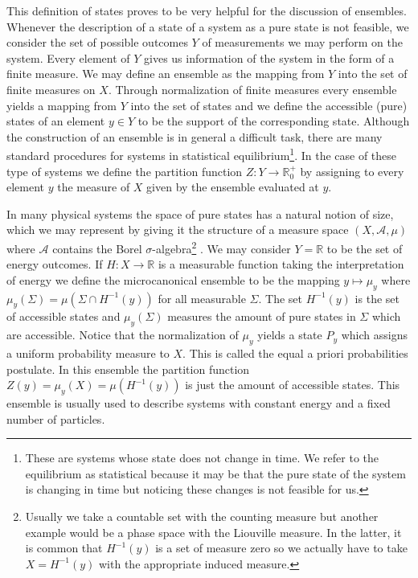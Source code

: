 This definition of states proves to be very helpful for the discussion of ensembles. Whenever the description of a state of a system as a pure state is not feasible, we consider the set of possible outcomes $Y$ of measurements we may perform on the system. Every element of $Y$ gives us information of the system in the form of a finite measure. We may define an ensemble as the mapping from $Y$ into the set of finite measures on $X$. Through normalization of finite measures every ensemble yields a mapping from $Y$ into the set of states and we define the accessible (pure) states of an element $y\in Y$ to be the support of the corresponding state. Although the construction of an ensemble is in general a difficult task,  there are many standard procedures for systems in statistical equilibrium\footnote{These are systems whose state does not change in time. We refer to the equilibrium as statistical because it may be that the pure state of the system is changing in time but noticing these changes is not feasible for us.}. In the case of these type of systems we define the partition function $Z:Y\to \mathbb{R}^+_0$ by assigning to every element $y$ the measure of $X$ given by the ensemble evaluated at $y$.

\begin{example}
In many physical systems the space of pure states has a natural notion of size, which we may represent by giving it the structure of a measure space $(X,\mathcal{A},\mu)$ where $\mathcal{A}$ contains the Borel $\sigma$-algebra\footnote{Usually we take a countable set with the counting measure but another example would be a phase space with the Liouville measure. In the latter, it is common that $H^{-1}(y)$ is a set of measure zero so we actually have to take $X=H^{-1}(y)$ with the appropriate induced measure.} . We may consider $Y = \mathbb{R}$ to be the set of energy outcomes. If $H:X\rightarrow \mathbb{R}$ is a measurable function taking the interpretation of energy we define the microcanonical ensemble to be the mapping $y\mapsto \mu_y$ where $\mu_y(\Sigma) = \mu(\Sigma\cap H^{-1}(y))$ for all measurable $\Sigma$. The set $H^{-1}(y)$ is the set of accessible states and $\mu_y(\Sigma)$ measures the amount of pure states in $\Sigma$ which are accessible. Notice that the normalization of $\mu_y$ yields a state $P_y$ which assigns a uniform probability measure to $X$. This is called the equal a priori probabilities postulate. In this ensemble the partition function $Z(y) = \mu_y(X) = \mu(H^{-1}(y))$ is just the amount of accessible states. This ensemble is usually used to describe systems with constant energy and a fixed number of particles.
\end{example}

